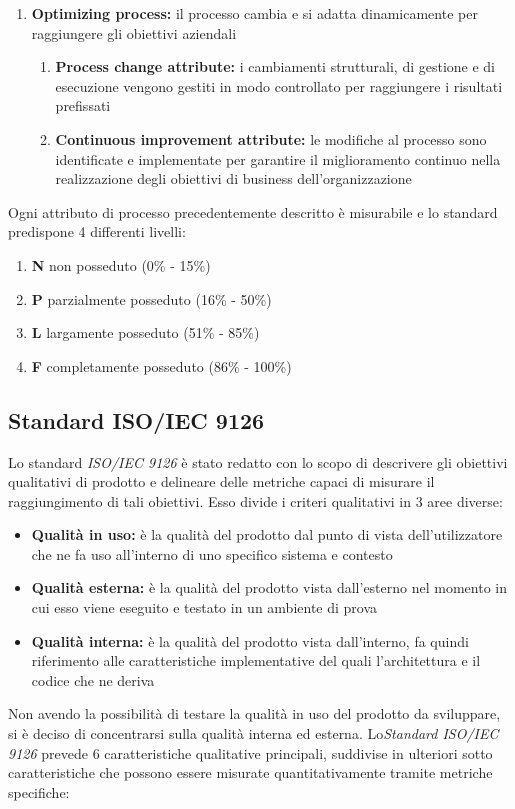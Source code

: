 \documentclass[12pt,a4paper]{article}
\begin{document}
\begin{enumerate}
	\item\textbf{Optimizing process:} il processo cambia e si adatta dinamicamente per raggiungere gli obiettivi aziendali
	\begin{enumerate}
		\item \textbf{Process change attribute:} i cambiamenti strutturali, di gestione e di esecuzione vengono gestiti in modo controllato per raggiungere i risultati prefissati
		\item \textbf{Continuous improvement attribute:} le modifiche al processo sono identificate e implementate per garantire il miglioramento continuo nella realizzazione degli obiettivi di business dell'organizzazione
	\end{enumerate}
\end{enumerate}

Ogni attributo di processo precedentemente descritto è misurabile e lo standard predispone 4 differenti livelli:
\begin{enumerate}
	\item \textbf{N} non posseduto (0\% - 15\%)
	\item \textbf{P} parzialmente posseduto (16\% - 50\%)
	\item \textbf{L} largamente posseduto (51\% - 85\%)
	\item \textbf{F} completamente posseduto (86\% - 100\%)
\end{enumerate}

\subsection{Standard ISO/IEC 9126}
Lo standard \textit{ISO/IEC 9126} è stato redatto con lo scopo di descrivere gli obiettivi
qualitativi di prodotto e delineare delle metriche capaci di misurare il raggiungimento
di tali obiettivi. Esso divide i criteri qualitativi in 3 aree diverse:
\begin{itemize}
	\item \textbf{Qualità in uso:} è la qualità del prodotto  dal punto di vista dell'utilizzatore che ne fa uso all'interno di uno specifico sistema e contesto
	\item \textbf{Qualità esterna:} è la qualità del prodotto  vista dall'esterno nel momento in cui esso viene eseguito e testato in un ambiente di prova
	\item \textbf{Qualità interna:} è la qualità del prodotto  vista dall'interno, fa quindi riferimento alle caratteristiche implementative del  quali l'architettura e il codice che ne deriva
\end{itemize}
Non avendo la possibilità di testare la qualità in uso del prodotto  da sviluppare, si è deciso di concentrarsi sulla qualità interna ed esterna. Lo\textit{Standard ISO/IEC 9126}
prevede 6 caratteristiche qualitative principali, suddivise in ulteriori sotto caratteristiche
che possono essere misurate quantitativamente tramite metriche specifiche:
\end{document}
